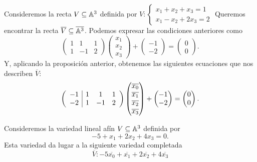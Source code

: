  \begin{example}
  Consideremos la recta $V \subseteq \mathbb{A}^3$ definida por $V:
  \begin{cases}
    x_1+x_2+x_3 = 1\\
    x_1-x_2+2x_3 = 2
  \end{cases}
  $
  Queremos encontrar la recta $\overline{V} \subseteq \overline{\mathbb{A}^3}$. Podemos
  expresar las condiciones anteriores como
  \[
    \begin{pmatrix}
      1 & 1 & 1 \\
      1 & -1 & 2 
    \end{pmatrix}
   \begin{pmatrix} x_1 \\ x_2 \\ x_3 \end{pmatrix} 
   + 
   \begin{pmatrix}
     -1 \\ -2
   \end{pmatrix}
   =
   \begin{pmatrix}
     0 \\ 0
   \end{pmatrix}.
 \]
Y, aplicando la proposición anterior, obtenemos las siguientes ecuaciones que nos
describen $\overline{V}$:
\[
  \left(
  \begin{array}{c|ccc}
      -1 & 1 & 1 & 1 \\
      -2 & 1 & -1 & 2 
    \end{array}
    \right)
    \begin{pmatrix} \overline{x_0} \\ \overline{x_1} \\ \overline{x_2} \\ 
      \overline{x_3} \end{pmatrix} 
   + 
   \begin{pmatrix}
     -1 \\ -2
   \end{pmatrix}
   =
   \begin{pmatrix}
     0 \\ 0
   \end{pmatrix}.
 \]
 \end{example}
 \begin{example}
   Consideremos la variedad lineal afín $V \subseteq \mathbb{A}^3$ definida por
   \[-5 + x_1 + 2x_2 + 4x_3 = 0.\]
   Esta variedad da lugar a la siguiente variedad completada
   \[
     \overline{V}\colon -5\overline{x_0} + \overline{x_1} + 2\overline{x_2} + 
   4\overline{x_3}
 \]
 \end{example}

